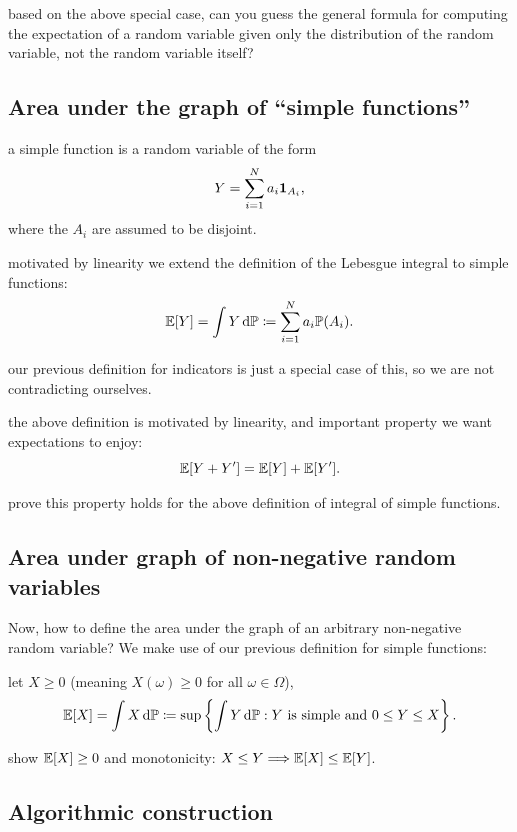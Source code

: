 \documentclass{article}
\begin{document}
 based on the above special case, can you guess the general formula for computing the expectation of a random variable given only the distribution of the random variable, not the random variable itself?


\subsection{Area under the graph of ``simple functions''}\label{sec:area-simple-function}

 a simple function is a random variable of the form
\[ Y = \sum_{i = 1}^N a_i {\mathbf 1}_{A_i}, \]
where the $A_i$ are assumed to be disjoint.

 motivated by linearity we extend the definition of the Lebesgue integral to simple functions:
\[ {\mathbb E}[Y] = \int Y \,\mathrm{d} {\mathbb P} \coloneqq \sum_{i=1}^N a_i {\mathbb P}(A_i). \]

 our previous definition for indicators is just a special case of this, so we are not contradicting ourselves.

 the above definition is motivated by linearity, and important property we want expectations to enjoy:
\[ {\mathbb E}[Y + Y'] = {\mathbb E}[Y] + {\mathbb E}[Y']. \]

 prove this property holds for the above definition of integral of simple functions.


\subsection{Area under graph of non-negative random variables}

Now, how to define the area under the graph of an arbitrary non-negative random variable? We make use of our previous definition for simple functions:

 let $X \ge 0$ (meaning $X(\omega) \ge 0$ for all $\omega \in \Omega$), 
\[ {\mathbb E}[X] = \int X \,\mathrm{d} {\mathbb P} \coloneqq \sup\left\{ \int Y \,\mathrm{d} {\mathbb P} : Y\text{ is simple and } 0 \le Y \le X\right\}. \] 

 show ${\mathbb E}[X] \ge 0$ and monotonicity: $X \le Y \Longrightarrow {\mathbb E}[X] \le {\mathbb E}[Y]$. 


\subsection{Algorithmic construction}
\end{document}
